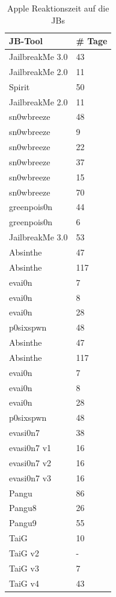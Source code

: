 \begin{table}[htp!]
    \begin{center}
        \begin{tabular}{|l|l|} \hline
           \textbf{JB-Tool} & \textbf{\# Tage} \\ \hline
JailbreakMe 3.0 & 43 \\ \hline
JailbreakMe 2.0	& 11\\ \hline
Spirit &	50\\ \hline
JailbreakMe 2.0	& 11\\ \hline
sn0wbreeze	& 48\\ \hline
sn0wbreeze	& 9\\ \hline
sn0wbreeze	& 22\\ \hline
sn0wbreeze	& 37\\ \hline
sn0wbreeze	 & 15\\ \hline
sn0wbreeze	& 70\\ \hline
greenpois0n	& 44\\ \hline
greenpois0n	 & 6\\ \hline
JailbreakMe 3.0	& 53\\ \hline
Absinthe	 & 47\\ \hline
Absinthe	 & 117\\ \hline
evai0n	 & 7\\ \hline
evai0n	 & 8\\ \hline
evai0n	 & 28\\ \hline
p0sixspwn	 & 48\\ \hline
Absinthe	 & 47\\ \hline
Absinthe	 & 117\\ \hline
evai0n	 & 7\\ \hline
evai0n	& 8\\ \hline
evai0n	& 28\\ \hline
p0sixspwn	& 48 \\ \hline
evasi0n7 & 38 \\ \hline
evasi0n7 v1 & 16\\ \hline
evasi0n7 v2 & 16 \\ \hline
evasi0n7 v3 & 16 \\ \hline               
Pangu & 86 \\ \hline
Pangu8 & 26 \\ \hline
Pangu9 & 55 \\ \hline
TaiG & 10  \\ \hline
TaiG v2 & - \\ \hline
TaiG v3 & 7  \\ \hline
TaiG v4 & 43  \\ \hline
\end{tabular}
        \caption{Apple Reaktionszeit auf die JBs}
        \label{tab:AppleReaktionszeitAll}
    \end{center}
\end{table}
